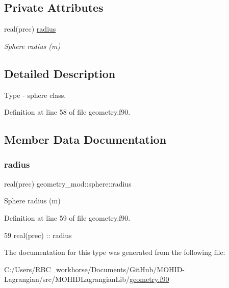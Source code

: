 \subsection*{Private Attributes}
\begin{DoxyCompactItemize}
\item 
real(prec) \mbox{\hyperlink{structgeometry__mod_1_1sphere_aea9381f351c3670047fb7a779ef44fd7}{radius}}
\begin{DoxyCompactList}\small\item\em Sphere radius (m) \end{DoxyCompactList}\end{DoxyCompactItemize}


\subsection{Detailed Description}
Type -\/ sphere class. 

Definition at line 58 of file geometry.\+f90.



\subsection{Member Data Documentation}
\mbox{\label{structgeometry__mod_1_1sphere_aea9381f351c3670047fb7a779ef44fd7}} 
\subsubsection{\texorpdfstring{radius}{radius}}
{\footnotesize\ttfamily real(prec) geometry\+\_\+mod\+::sphere\+::radius\hspace{0.3cm}{\ttfamily [private]}}



Sphere radius (m) 



Definition at line 59 of file geometry.\+f90.


\begin{DoxyCode}
59         \textcolor{keywordtype}{real(prec)} :: radius
\end{DoxyCode}


The documentation for this type was generated from the following file\+:\begin{DoxyCompactItemize}
\item 
C\+:/\+Users/\+R\+B\+C\+\_\+workhorse/\+Documents/\+Git\+Hub/\+M\+O\+H\+I\+D-\/\+Lagrangian/src/\+M\+O\+H\+I\+D\+Lagrangian\+Lib/\mbox{\hyperlink{geometry_8f90}{geometry.\+f90}}\end{DoxyCompactItemize}
